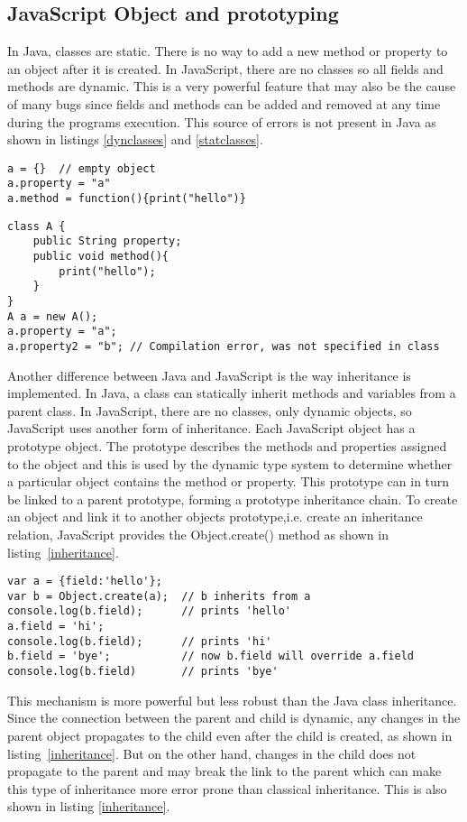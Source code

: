 \subsection{JavaScript Object and prototyping}
In Java, classes are static. There is no way to add a new method or property to an object after it is created. In JavaScript, there are no classes so all fields and methods are dynamic. This is a very powerful feature that may also be the cause of many bugs since fields and methods can be added and removed at any time during the programs execution. This source of errors is not present in Java as shown in listings \ref{dynclasses} and \ref{statclasses}.

\begin{lstlisting}[caption=JavaScript,label=dynclasses]
a = {} 	// empty object
a.property = "a"
a.method = function(){print("hello")}
\end{lstlisting}	

\begin{lstlisting}[caption=Java,label=statclasses]
class A {
	public String property;
	public void method(){
		print("hello");
	}
}
A a = new A();
a.property = "a";
a.property2 = "b"; // Compilation error, was not specified in class
\end{lstlisting}
Another difference between Java and JavaScript is the way inheritance is implemented. In Java, a class can statically inherit methods and variables from a parent class. In JavaScript, there are no classes, only dynamic objects, so JavaScript uses another form of inheritance. Each JavaScript object has a prototype object. The prototype describes the methods and properties assigned to the object and this is used by the dynamic type system to determine whether a particular object contains the method or property. This prototype can in turn be linked to a parent prototype, forming a prototype inheritance chain. To create an object and link it to another objects prototype,i.e. create an inheritance relation, JavaScript provides the Object.create() method as shown in listing~\ref{inheritance}.

\begin{lstlisting}[caption=Inheritance,label=inheritance]
var a = {field:'hello'};
var b = Object.create(a);  // b inherits from a
console.log(b.field);      // prints 'hello'
a.field = 'hi';
console.log(b.field);      // prints 'hi'
b.field = 'bye';           // now b.field will override a.field
console.log(b.field)       // prints 'bye'
\end{lstlisting}	
This mechanism is more powerful but less robust than the Java class inheritance. Since the connection between the parent and child is dynamic, any changes in the parent object propagates to the child even after the child is created, as shown in listing~\ref{inheritance}. But on the other hand, changes in the child does not propagate to the parent and may break the link to the parent which can make this type of inheritance more error prone than classical inheritance. This is also shown in listing \ref{inheritance}.


